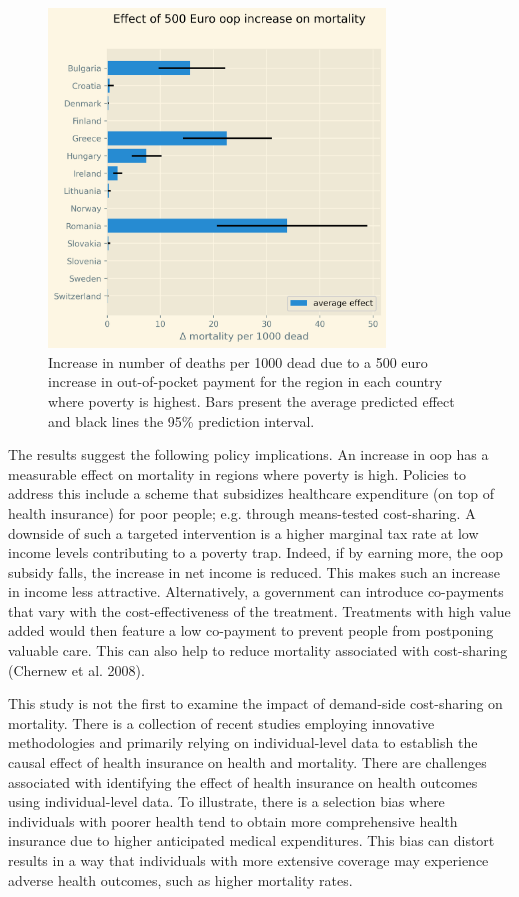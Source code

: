 \documentclass[a4paper,12pt]{article}
\makeatletter
\newcommand{\citeprocitem}[2]{\hyper@linkstart{cite}{citeproc_bib_item_#1}#2\hyper@linkend}
\makeatother
\begin{document}
\begin{figure}[htbp]
\centering
\includegraphics[height=9cm]{./figures/change_mortality_countries_baseline.png}
\caption{\label{fig:SummaryFigure}Increase in number of deaths per 1000 dead due to a 500 euro increase in out-of-pocket payment for the region in each country where poverty is highest. Bars present the average predicted effect and black lines the 95\% prediction interval.}
\end{figure}

The results suggest the following policy implications. An increase in oop has a measurable effect on mortality in regions where poverty is high. Policies to address this include a scheme that subsidizes healthcare expenditure (on top of health insurance) for poor people; e.g. through means-tested cost-sharing. A downside of such a targeted intervention is a higher marginal tax rate at low income levels contributing to a poverty trap. Indeed, if by earning more, the oop subsidy falls, the increase in net income is reduced. This makes such an increase in income less attractive. Alternatively, a government can introduce co-payments that vary with the cost-effectiveness of the treatment. Treatments with high value added would then feature a low co-payment to prevent people from postponing valuable care. This can also help to reduce mortality associated with cost-sharing (\citeprocitem{6}{Chernew et al. 2008}).

This study is not the first to examine the impact of demand-side cost-sharing on mortality. There is a collection of recent studies employing innovative methodologies and primarily relying on individual-level data to establish the causal effect of health insurance on health and mortality. There are challenges associated with identifying the effect of health insurance on health outcomes using individual-level data. To illustrate, there is a selection bias where individuals with poorer health tend to obtain more comprehensive health insurance due to higher anticipated medical expenditures. This bias can distort results in a way that individuals with more extensive coverage may experience adverse health outcomes, such as higher mortality rates. 
\end{document}
